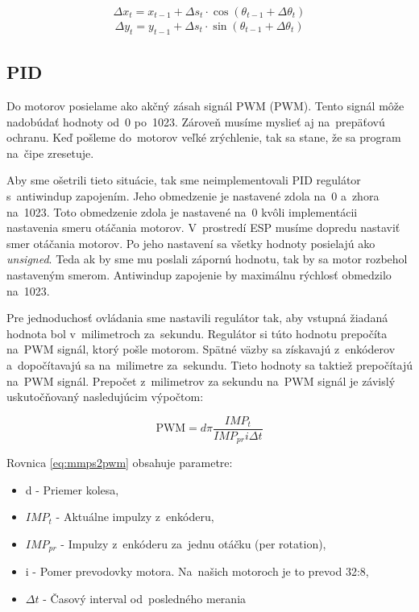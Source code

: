 \begin{equation}
	\label{eq:odometria}
	 \Delta x_t = x_{t-1} + \Delta s_t \cdot \cos(\theta_{t-1} + \Delta \theta_t)
\end{equation}
\begin{align*}
	\Delta y_t = y_{t-1} + \Delta s_t \cdot \sin(\theta_{t-1} + \Delta \theta_t)
\end{align*}

\newpage

\subsection{PID}
\label{subsec:pid}

Do motorov posielame ako akčný zásah signál PWM (\acrlong{PWM}). Tento signál môže nadobúdať hodnoty od~0 po~1023.
Zároveň musíme myslieť aj na~prepäťovú ochranu. Keď pošleme do~motorov veľké zrýchlenie, tak sa stane, že sa program
na~čipe zresetuje.

Aby sme ošetrili tieto situácie, tak sme neimplementovali PID regulátor s~antiwindup zapojením. Jeho obmedzenie je
nastavené zdola na~0 a~zhora na~1023. Toto obmedzenie zdola je nastavené na~0 kvôli implementácii nastavenia smeru
otáčania motorov. V~prostredí ESP musíme dopredu nastaviť smer otáčania motorov. Po jeho nastavení sa všetky hodnoty
posielajú ako \textit{unsigned}. Teda ak by sme mu poslali zápornú hodnotu, tak by sa motor rozbehol nastaveným smerom.
Antiwindup zapojenie by maximálnu rýchlosť obmedzilo na~1023.

Pre jednoduchosť ovládania sme nastavili regulátor tak, aby vstupná žiadaná hodnota bol v~milimetroch za~sekundu.
Regulátor si túto hodnotu prepočíta na~PWM signál, ktorý pošle motorom. Spätné väzby sa získavajú z~enkóderov
a~dopočítavajú sa na~milimetre za~sekundu. Tieto hodnoty sa taktiež prepočítajú na~PWM signál. Prepočet z~milimetrov
za sekundu na~PWM signál je závislý uskutočňovaný nasledujúcim výpočtom:

\begin{equation}
	\text{PWM} = d \pi \frac{IMP_t}{IMP_{pr} i \Delta t}
	\label{eq:mmps2pwm}
\end{equation}

Rovnica \ref{eq:mmps2pwm} obsahuje parametre:
\begin{itemize}
	\item d - Priemer kolesa,
	\item $IMP_t$ - Aktuálne impulzy z~enkóderu,
	\item $IMP_{pr}$ - Impulzy z~enkóderu za~jednu otáčku (per rotation),
	\item i - Pomer prevodovky motora. Na~našich motoroch je to prevod 32:8,
	\item $\Delta t$ - Časový interval od~posledného merania
\end{itemize}

